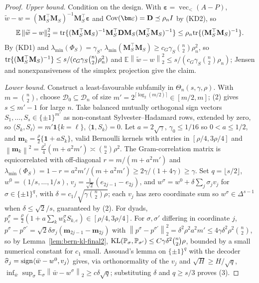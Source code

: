 \documentclass[12pt]{article}
\newcommand{\E}{\mathbb{E}}
\newcommand{\1}{\mathbf{1}}
\newcommand{\norm}[1]{\left\lVert#1\right\rVert}
\providecommand{\Pb}{\mathbb P}
\begin{document}
\begin{proof}
\emph{Upper bound.} Condition on the design. With $\bm\varepsilon=\operatorname{vec}_<(A-P)$,
$\widetilde w-w=(\mathbf M_S^\top\mathbf M_S)^{-1}\mathbf M_S^\top\bm\varepsilon$ and
${\rm Cov}(\bm\varepsilon)=\mathbf D\preceq\rho_n I$ by (KD2), so
\[
        \E\norm{\widetilde w-w}_2^2={\rm tr}\{(\mathbf M_S^\top\mathbf M_S)^{-1}\mathbf M_S^\top\mathbf
        D\mathbf M_S(\mathbf M_S^\top\mathbf M_S)^{-1}\}\le\rho_n{\rm tr}\{(\mathbf M_S^\top\mathbf M_S)^{-1}\}.
\]
By (KD1) and $\lambda_{\min}(\Phi_S)=\gamma_S$, $\lambda_{\min}(\mathbf M_S^\top\mathbf M_S)\ge
c_G\gamma_S\binom{n}{2}\rho_n^2$, so ${\rm tr}\{(\mathbf M_S^\top\mathbf M_S)^{-1}\}\le s/(c_G\gamma_S\binom{n}{2}\rho_n^2)$
and $\E\norm{\widetilde w-w}_2^2\le s/(c_G\gamma_S\binom{n}{2}\rho_n)$; Jensen and nonexpansiveness of the
simplex projection give the claim.

\emph{Lower bound.}
\label{app:lower}
Construct a least-favourable subfamily in $\Theta_n(s,\gamma,\rho)$. With $m=\binom{n}{2}$, choose
$\mathcal D_0\subseteq\mathcal D_n$ of size $m'=2^{\lceil\log_2(m/2)\rceil}\in[m/2,m]$; (2) gives
$s\le m'-1$ for large $n$. Take balanced mutually orthogonal sign vectors $S_1,\dots,S_s\in\{\pm1\}^{m'}$
as non-constant Sylvester--Hadamard rows, extended by zero, so $\langle S_k,S_\ell\rangle=m'\1\{k=\ell\}$,
$\langle\1,S_k\rangle=0$. Let $a=2\sqrt\gamma$, $\gamma_0\le1/16$ so $0<a\le1/2$, and $\mathbf
m_k=\tfrac\rho2\{\1+aS_k\}$, valid Bernoulli kernels with entries in $[\rho/4,3\rho/4]$ and
$\norm{\mathbf m_k}^2=\tfrac{\rho^2}4(m+a^2m')\asymp \binom{n}{2}\rho^2$. The Gram-correlation matrix is
equicorrelated with off-diagonal $r=m/(m+a^2m')$ and $\lambda_{\min}(\Phi_S)=1-r=a^2m'/(m+a^2m')\ge
2\gamma/(1+4\gamma)\ge\gamma$. Set $q=\lfloor s/2\rfloor$, $w^0=(1/s,\dots,1/s)$, $v_j=\tfrac1{\sqrt2}(e_{2j-1}-e_{2j})$,
and $w^\sigma=w^0+\delta\sum_j\sigma_jv_j$ for $\sigma\in\{\pm1\}^q$, with $\delta=c_1/\sqrt{\gamma
\binom{n}{2}\rho}$; each $v_j$ has zero coordinate sum so $w^\sigma\in\Delta^{s-1}$ when $\delta\le\sqrt2/s$,
guaranteed by (2). For dyads, $p^\sigma_e=\tfrac\rho2(1+a\sum_kw^\sigma_kS_{k,e})\in[\rho/4,3\rho/4]$.
For $\sigma,\sigma'$ differing in coordinate $j$, $p^\sigma-p^{\sigma'}=\sqrt2\delta\sigma_j(\mathbf
m_{2j-1}-\mathbf m_{2j})$ with $\norm{p^\sigma-p^{\sigma'}}_2^2=\delta^2\rho^2a^2m'\le4\gamma\delta^2\rho^2\binom{n}{2}$,
so by Lemma~\ref{lem:bern-kl-final2}, ${\rm KL}(\Pb_\sigma,\Pb_{\sigma'})\le C\gamma\delta^2\binom{n}{2}\rho$,
bounded by a small numerical constant for $c_1$ small. Assouad's lemma on $\{\pm1\}^q$ with the
decoder $\widehat\sigma_j={\rm sign}\langle\bar w-w^0,v_j\rangle$ gives, via orthonormality of the
$v_j$ and $\sqrt H\ge H/\sqrt q$, $\inf_{\bar w}\sup_\sigma\E_\sigma\norm{\bar w-w^\sigma}_2\ge
c\delta\sqrt q$; substituting $\delta$ and $q\ge s/3$ proves (3).
\end{proof}
\end{document}
